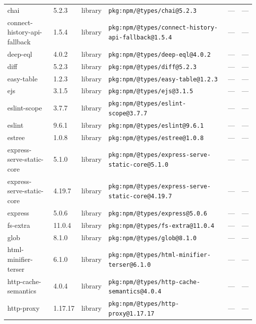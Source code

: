 \documentclass[11pt,a4paper]{article}
\begin{document}
\begin{longtable}{|p{4cm}|p{2cm}|p{1.6cm}|p{5cm}|p{1.5cm}|p{3.5cm}|}
\raggedright chai & 5.2.3 & library & \small\texttt{pkg:npm/@types/chai@5.2.3} & — & \small — \\
\raggedright connect-history-api-fallback & 1.5.4 & library & \small\texttt{pkg:npm/@types/connect-history-api-fallback@1.5.4} & — & \small — \\
\raggedright deep-eql & 4.0.2 & library & \small\texttt{pkg:npm/@types/deep-eql@4.0.2} & — & \small — \\
\raggedright diff & 5.2.3 & library & \small\texttt{pkg:npm/@types/diff@5.2.3} & — & \small — \\
\raggedright easy-table & 1.2.3 & library & \small\texttt{pkg:npm/@types/easy-table@1.2.3} & — & \small — \\
\raggedright ejs & 3.1.5 & library & \small\texttt{pkg:npm/@types/ejs@3.1.5} & — & \small — \\
\raggedright eslint-scope & 3.7.7 & library & \small\texttt{pkg:npm/@types/eslint-scope@3.7.7} & — & \small — \\
\raggedright eslint & 9.6.1 & library & \small\texttt{pkg:npm/@types/eslint@9.6.1} & — & \small — \\
\raggedright estree & 1.0.8 & library & \small\texttt{pkg:npm/@types/estree@1.0.8} & — & \small — \\
\raggedright express-serve-static-core & 5.1.0 & library & \small\texttt{pkg:npm/@types/express-serve-static-core@5.1.0} & — & \small — \\
\raggedright express-serve-static-core & 4.19.7 & library & \small\texttt{pkg:npm/@types/express-serve-static-core@4.19.7} & — & \small — \\
\raggedright express & 5.0.6 & library & \small\texttt{pkg:npm/@types/express@5.0.6} & — & \small — \\
\raggedright fs-extra & 11.0.4 & library & \small\texttt{pkg:npm/@types/fs-extra@11.0.4} & — & \small — \\
\raggedright glob & 8.1.0 & library & \small\texttt{pkg:npm/@types/glob@8.1.0} & — & \small — \\
\raggedright html-minifier-terser & 6.1.0 & library & \small\texttt{pkg:npm/@types/html-minifier-terser@6.1.0} & — & \small — \\
\raggedright http-cache-semantics & 4.0.4 & library & \small\texttt{pkg:npm/@types/http-cache-semantics@4.0.4} & — & \small — \\
\raggedright http-proxy & 1.17.17 & library & \small\texttt{pkg:npm/@types/http-proxy@1.17.17} & — & \small — \\

\end{longtable}
\end{document}
